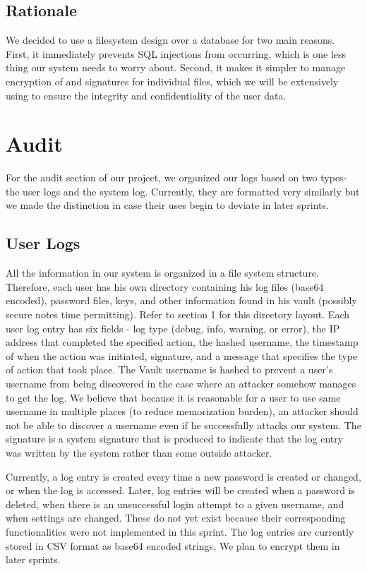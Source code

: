 \documentclass{article}
\begin{document}
\subsection{Rationale}
\par We decided to use a filesystem design over a database for two main reasons. First, it immediately prevents SQL injections from occurring, which is one less thing our system needs to worry about. Second, it makes it simpler to manage encryption of and signatures for individual files, which we will be extensively using to ensure the integrity and confidentiality of the user data.

\section{Audit}
For the audit section of our project, we organized our logs based on two types- the user logs and the system log. Currently, they are formatted very similarly but we made the distinction in case their uses begin to deviate in later sprints.
\subsection{User Logs}
\par All the information in our system is organized in a file system structure. Therefore, each user has his own directory containing his log files (base64 encoded), password files, keys, and other information found in his vault (possibly secure notes time permitting). Refer to section 1 for this directory layout. Each user log entry has six fields - log type (debug, info, warning, or error), the IP address that completed the specified action, the hashed username, the timestamp of when the action was initiated, signature, and a message that specifies the type of action that took place. The Vault username is hashed to prevent a user's username from being discovered in the case where an attacker somehow manages to get the log. We believe that because it is reasonable for a user to use same username in multiple places (to reduce memorization burden), an attacker should not be able to discover a username even if he successfully attacks our system. The signature is a system signature that is produced to indicate that the log entry was written by the system rather than some outside attacker.\\

\par Currently, a log entry is created every time a new password is created or changed, or when the log is accessed. Later, log entries will be created when a password is deleted, when there is an unsuccessful login attempt to a given username, and when settings are changed. These do not yet exist because their corresponding functionalities were not implemented in this sprint.  The log entries are currently stored in CSV format as base64 encoded strings. We plan to encrypt them in later sprints.\\
\end{document}
